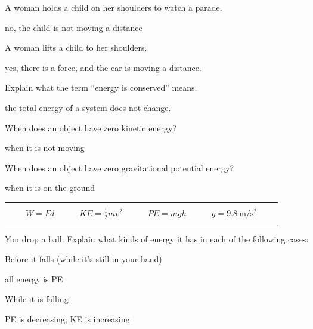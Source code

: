 \documentclass[10pt]{exam}
\newcommand{\printeqs}{
  \ifprintanswers
  \else
    \begin{center}
      \begin{tabular}{|*9c*5c|}
        \hline 
        &&&&&&&&&&&&&\\
        && 
        $W=Fd$                 & & & 
        $KE = \frac{1}{2}mv^2$ & & & 
        $PE=mgh$               & & & 
        $g=\SI{9.8}{\meter\per\second^2}$
        &&\\
        &&&&&&&&&&&&&\\
        \hline 
      \end{tabular}
    \end{center}
  \fi
}
\begin{document}
\begin{questions}
\begin{parts}
    \item 
      A woman holds a child on her shoulders to watch a parade.
    
      \begin{solution}[3em]
        no, the child is not moving a distance
      \end{solution}

    \item
      A woman lifts a child to her shoulders.
    
      \begin{solution}[3em]
        yes, there is a force, and the car is moving a distance.
      \end{solution}

  \end{parts}

\question
  Explain what the term ``energy is conserved'' means.

  \begin{solution}[\stretch{1}]
    the total energy of a system does not change.
  \end{solution}

\question
  When does an object have zero kinetic energy? 

  \begin{solution}[3em]
    when it is not moving
  \end{solution}

\question
  When does an object have zero gravitational potential energy?

  \begin{solution}[3em]
    when it is on the ground
  \end{solution}

\pagebreak
\printeqs

\question
  You drop a ball.  Explain what kinds of energy it has in each of the following cases:

  \begin{parts}
    \item 
      Before it falls (while it's still in your hand)

        \begin{solution}[3em]
          all energy is PE
        \end{solution}

    \item 
      While it is falling

        \begin{solution}[3em]
          PE is decreasing; KE is increasing
        \end{solution}


\end{parts}
\end{questions}
\end{document}
